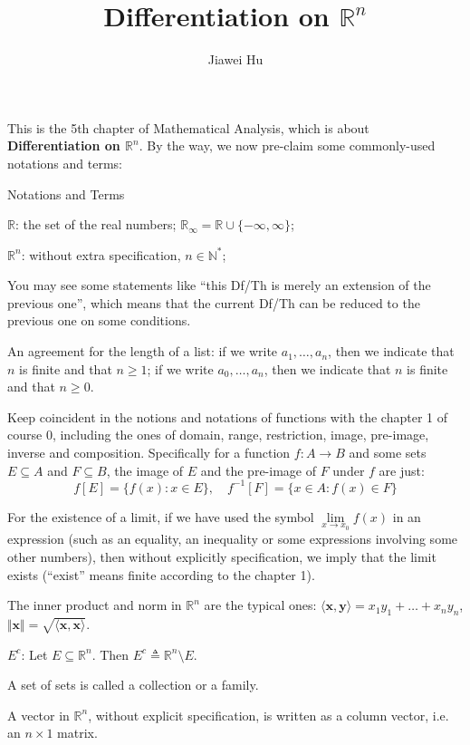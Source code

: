 \documentclass{article}
\title{\LARGE \textbf{Differentiation on $\mathbb{R}^n$}}
\author{\large Jiawei Hu}
\begin{document}
\maketitle

This is the 5th chapter of Mathematical Analysis, which is about \textbf{Differentiation on $\mathbb{R}^n$}. By the way, we now pre-claim some commonly-used notations and terms:
\begin{Df}{Notations and Terms}
    \begin{compactenum}
        \item $\mathbb{R}$: the set of the real numbers; $\mathbb{R}_\infty = \mathbb{R}\cup\{-\infty, \infty\}$;
        \item $\mathbb{R}^n$: without extra specification, $n\in\mathbb{N}^\ast$; 
        \item You may see some statements like ``this Df/Th is merely an extension of the previous one'', which means that the current Df/Th can be reduced to the previous one on some conditions.
        \item An agreement for the length of a list: if we write $a_1, \dots, a_n$, then we indicate that $n$ is finite and that $n\geq 1$; if we write $a_0, \dots, a_n$, then we indicate that $n$ is finite and that $n\geq 0$.
        \item Keep coincident in the notions and notations of functions with the chapter 1 of course 0, including the ones of domain, range, restriction, image, pre-image, inverse and composition. Specifically for a function $f: A\rightarrow B$ and some sets $E\subseteq A$ and $F\subseteq B$, the image of $E$ and the pre-image of $F$ under $f$ are just:
        $$f[E] = \{f(x): x\in E\},\quad f^{-1}[F] = \{x\in A: f(x)\in F\}$$
        \item For the existence of a limit, if we have used the symbol $\lim\limits_{x\to x_0} f(x)$ in an expression (such as an equality, an inequality or some expressions involving some other numbers), then without explicitly specification, we imply that the limit exists (``exist'' means finite according to the chapter 1).
        \item The inner product and norm in $\mathbb{R}^n$ are the typical ones: $\langle \pmb{x}, \pmb{y}\rangle = x_1y_1 + \dots + x_ny_n$, $\Vert \pmb{x}\Vert = \sqrt{\langle \pmb{x}, \pmb{x}\rangle}$.
        \item $E^c$: Let $E\subseteq\mathbb{R}^n$. Then $E^c\triangleq \mathbb{R}^n\setminus E$.
        \item A set of sets is called a collection or a family.
        \item A vector in $\mathbb{R}^n$, without explicit specification, is written as a column vector, i.e. an $n\times 1$ matrix.
    \end{compactenum}
\end{Df}
\end{document}
